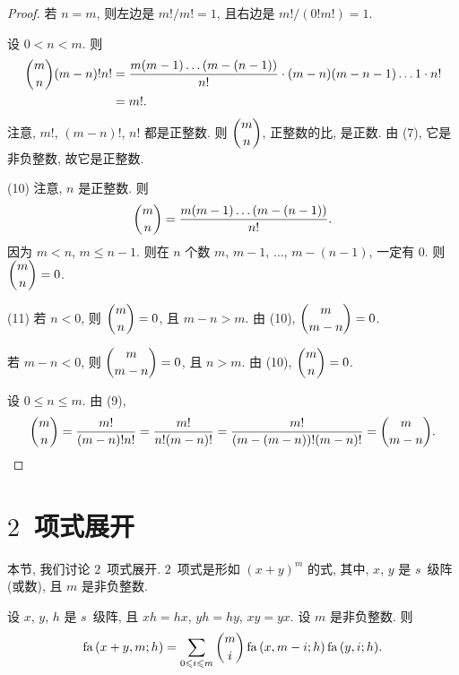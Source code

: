 \documentclass[../libro.tex]{subfiles}
\begin{document}
\begin{proof}
    若 \(n = m\), 则左边是 \(m!/m! = 1\), 且右边是 \(m!/(0! m!) = 1\).

    设 \(0 < n < m\).
    则
    \begin{align*}
        \dbinom{m}{n} (m - n)! n!
        = {} &
        \frac{m (m - 1) \dots (m - (n - 1))}{n!}
        \cdot (m - n) (m - n - 1) \dots 1 \cdot n!
        \\
        = {} &
        m!.
    \end{align*}
    注意, \(m!\), \((m - n)!\), \(n!\) 都是正整数.
    则 \(\dbinom{m}{n}\), 正整数的比, 是正数.
    由 (7), 它是非负整数, 故它是正整数.

    (10)
    注意, \(n\) 是正整数.
    则
    \begin{align*}
        \dbinom{m}{n} = \frac{m (m - 1) \dots (m - (n - 1))}{n!}.
    \end{align*}
    因为 \(m < n\), \(m \leq n - 1\).
    则在 \(n\) 个数 \(m\), \(m - 1\), \(\dots\), \(m - (n - 1)\),
    一定有 \(0\).
    则 \(\dbinom{m}{n} = 0\).

    (11)
    若 \(n < 0\), 则 \(\dbinom{m}{n} = 0\), 且 \(m - n > m\).
    由 (10), \(\dbinom{m}{m - n} = 0\).

    若 \(m - n < 0\), 则 \(\dbinom{m}{m - n} = 0\), 且 \(n > m\).
    由 (10), \(\dbinom{m}{n} = 0\).

    设 \(0 \leq n \leq m\).
    由 (9),
    \begin{equation*}
        \dbinom{m}{n}
        = \frac{m!}{(m - n)! n!}
        = \frac{m!}{n! (m - n)!}
        = \frac{m!}{(m - (m - n))! (m - n)!}
        = \dbinom{m}{m - n}.
        \qedhere
    \end{equation*}
\end{proof}

\section{\texorpdfstring{\(2\)~项式展开}%
{2 项式展开}}

本节, 我们讨论 \(2\)~项式展开.
\(2\)~项式是形如 \((x + y)^m\) 的式,
其中, \(x\), \(y\) 是 \(s\)~级阵 (或数),
且 \(m\) 是非负整数.

\begin{theorem}
    设 \(x\), \(y\), \(h\) 是 \(s\)~级阵,
    且 \(x h = h x\), \(y h = h y\), \(x y = y x\).
    设 \(m\) 是非负整数.
    则
    \begin{align*}
        \operatorname{fa} {(x + y, m; h)}
        = \sum_{0 \leq i \leq m} {
            \dbinom{m}{i}
            \operatorname{fa} {(x, m - i; h)}
            \operatorname{fa} {(y, i; h)}
        }.
    \end{align*}
\end{theorem}
\end{document}
